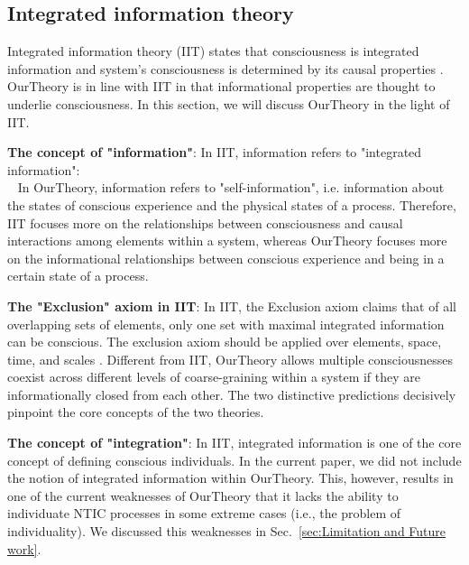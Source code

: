 \documentclass[utf8]{article}
\begin{document}
        
		\subsection{Integrated information theory}
            Integrated information theory (IIT) states that consciousness is integrated information and system's consciousness is determined by its causal properties \citep{tononi2016integrated}. \ac{OurTheory} is in line with IIT in that informational properties are thought to underlie consciousness. In this section, we will discuss \ac{OurTheory} in the light of IIT. 
            
            \textbf{The concept of "information"}: In IIT, information refers to "integrated information":\\ ~\citep{tononi2016integrated} In \ac{OurTheory}, information refers to "self-information", i.e. information about the states of conscious experience and the physical states of a process. Therefore, IIT focuses more on the relationships between consciousness and causal interactions among elements within a system, whereas \ac{OurTheory} focuses more on the informational relationships between conscious experience and being in a certain state of a process. 
		    
		    \textbf{The "Exclusion" axiom in IIT}: In IIT, the Exclusion axiom claims that of all overlapping sets of elements, only one set with maximal integrated information can be conscious. The exclusion axiom should be applied over elements, space, time, and scales \citep{oizumi2014phenomenology, hoel2016can}. Different from IIT, \ac{OurTheory} allows multiple consciousnesses coexist across different levels of coarse-graining within a system if they are informationally closed from each other. The two distinctive predictions decisively pinpoint the core concepts of the two theories. 

		    \textbf{The concept of "integration"}: In IIT, integrated information is one of the core concept of defining conscious individuals. In the current paper, we did not include the notion of integrated information within \ac{OurTheory}. This, however, results in one of the current weaknesses of \ac{OurTheory} that it lacks the ability to individuate NTIC processes in some extreme cases (i.e., the problem of individuality). We discussed this weaknesses in Sec.~\ref{sec:Limitation and Future work}.
		    
\end{document}
